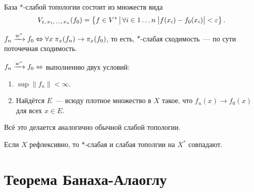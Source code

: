 \documentclass{notes}
\newcommand{\ta}{$*$}
\newcommand{\sweak}{\xrightarrow{w^{*}}}
\begin{document}
	\begin{st}
		База \ta-слабой топологии состоит из множеств вида
		\[
			V_{\varepsilon, \, x_1, \, \ldots, \, x_n}(f_0) = \left\{f \in V^{*} \, \big | \, \forall i \in 1\ldots n \; \big|f(x_i) - f_0(x_i)\big| < \varepsilon \right\}.
		\]
	\end{st}

	\begin{st}
		$f_n \sweak f_0 \eqv \all x \; \pi_x(f_n) \to \pi_x(f_0)$, то есть, \ta-слабая сходимость~--- по сути поточечная сходимость.
	\end{st}

	\begin{thm}
		$f_n \sweak f_0 \eqv$ выполнению двух условий:
		\begin{enumerate}
			\item $\sup \|f_n\| < \infty$.
			\item Найдётся $E$~--- всюду плотное множество в $X$ такое, что $f_n(x) \to f_0(x)$ для всех $x \in E$.
		\end{enumerate}
	\end{thm}

	Всё это делается аналогично обычной слабой топологии.

	\begin{exm}
		Если $X$ рефлексивно, то \ta-слабая и слабая тополгии на $X^{*}$ совпадают. 
	\end{exm}

\section{Теорема Банаха-Алаоглу}
\end{document}
